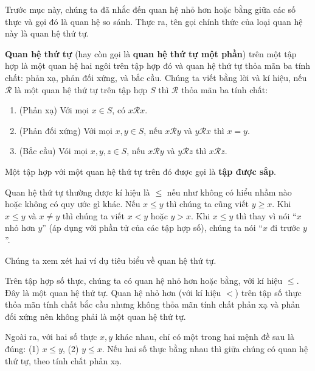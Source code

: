 Trước mục này, chúng ta đã nhắc đến quan hệ nhỏ hơn hoặc bằng giữa các số thực và gọi đó là quan hệ so sánh. Thực ra, tên gọi chính thức của loại quan hệ này là quan hệ thứ tự.

\begin{definition}
    \textbf{Quan hệ thứ tự} (hay còn gọi là \textbf{quan hệ thứ tự một phần}) trên một tập hợp là một quan hệ hai ngôi trên tập hợp đó và quan hệ thứ tự thỏa mãn ba tính chất: phản xạ, phản đối xứng, và bắc cầu. Chúng ta viết bằng lời và kí hiệu, nếu $\mathscr{R}$ là một quan hệ thứ tự trên tập hợp $S$ thì $\mathscr{R}$ thỏa mãn ba tính chất:
    \begin{enumerate}[label={(\roman*)}]
        \item (Phản xạ) Với mọi $x\in S$, có $x\mathscr{R}x$.
        \item (Phản đối xứng) Với mọi $x, y\in S$, nếu $x\mathscr{R}y$ và $y\mathscr{R}x$ thì $x = y$.
        \item (Bắc cầu) Vói mọi $x, y, z\in S$, nếu $x\mathscr{R}y$ và $y\mathscr{R}z$ thì $x\mathscr{R}z$.
    \end{enumerate}

    \noindent Một tập hợp với một quan hệ thứ tự trên đó được gọi là \textbf{tập được sắp}.
\end{definition}

Quan hệ thứ tự thường được kí hiệu là $\leq$ nếu như không có hiểu nhầm nào hoặc không có quy ước gì khác. Nếu $x\leq y$ thì chúng ta cũng viết $y\geq x$. Khi $x\leq y$ và $x\ne y$ thì chúng ta viết $x < y$ hoặc $y > x$. Khi $x\leq y$ thì thay vì nói ``$x$ nhỏ hơn $y$'' (áp dụng với phần tử của các tập hợp số), chúng ta nói ``$x$ đi trước $y$''.

Chúng ta xem xét hai ví dụ tiêu biểu về quan hệ thứ tự.
\begin{example}
    Trên tập hợp số thực, chúng ta có quan hệ nhỏ hơn hoặc bằng, với kí hiệu $\leq$. Đây là một quan hệ thứ tự. Quan hệ nhỏ hơn (với kí hiệu $<$) trên tập số thực thỏa mãn tính chất bắc cầu nhưng không thỏa mãn tính chất phản xạ và phản đối xứng nên không phải là một quan hệ thứ tự.

    Ngoài ra, với hai số thực $x, y$ khác nhau, chỉ có một trong hai mệnh đề sau là đúng: (1) $x\leq y$, (2) $y\leq x$. Nếu hai số thực bằng nhau thì giữa chúng có quan hệ thứ tự, theo tính chất phản xạ.
\end{example}


